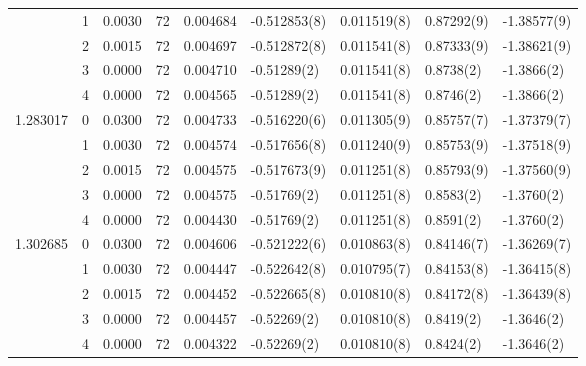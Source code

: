 \begin{tabular}{llrrrllll}
         & 1 &    0.0030 &     72 &  0.004684 &   -0.512853(8) &    0.011519(8) &     0.87292(9) &     -1.38577(9) \\
         & 2 &    0.0015 &     72 &  0.004697 &   -0.512872(8) &    0.011541(8) &     0.87333(9) &     -1.38621(9) \\
         & 3 &    0.0000 &     72 &  0.004710 &    -0.51289(2) &    0.011541(8) &      0.8738(2) &      -1.3866(2) \\
         & 4 &    0.0000 &     72 &  0.004565 &    -0.51289(2) &    0.011541(8) &      0.8746(2) &      -1.3866(2) \\
1.283017 & 0 &    0.0300 &     72 &  0.004733 &   -0.516220(6) &    0.011305(9) &     0.85757(7) &     -1.37379(7) \\
         & 1 &    0.0030 &     72 &  0.004574 &   -0.517656(8) &    0.011240(9) &     0.85753(9) &     -1.37518(9) \\
         & 2 &    0.0015 &     72 &  0.004575 &   -0.517673(9) &    0.011251(8) &     0.85793(9) &     -1.37560(9) \\
         & 3 &    0.0000 &     72 &  0.004575 &    -0.51769(2) &    0.011251(8) &      0.8583(2) &      -1.3760(2) \\
         & 4 &    0.0000 &     72 &  0.004430 &    -0.51769(2) &    0.011251(8) &      0.8591(2) &      -1.3760(2) \\
1.302685 & 0 &    0.0300 &     72 &  0.004606 &   -0.521222(6) &    0.010863(8) &     0.84146(7) &     -1.36269(7) \\
         & 1 &    0.0030 &     72 &  0.004447 &   -0.522642(8) &    0.010795(7) &     0.84153(8) &     -1.36415(8) \\
         & 2 &    0.0015 &     72 &  0.004452 &   -0.522665(8) &    0.010810(8) &     0.84172(8) &     -1.36439(8) \\
         & 3 &    0.0000 &     72 &  0.004457 &    -0.52269(2) &    0.010810(8) &      0.8419(2) &      -1.3646(2) \\
         & 4 &    0.0000 &     72 &  0.004322 &    -0.52269(2) &    0.010810(8) &      0.8424(2) &      -1.3646(2) \\
\bottomrule
\end{tabular}
